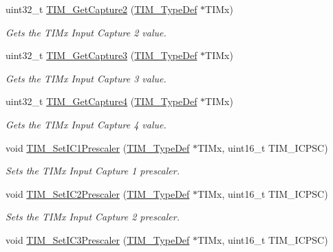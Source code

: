 \begin{DoxyCompactItemize}
uint32\+\_\+t \hyperlink{group___t_i_m___group3_ga2524cb5db14e388fb7f20c99fb3d58a5}{T\+I\+M\+\_\+\+Get\+Capture2} (\hyperlink{struct_t_i_m___type_def}{T\+I\+M\+\_\+\+Type\+Def} $\ast$T\+I\+Mx)
\begin{DoxyCompactList}\small\item\em Gets the T\+I\+Mx Input Capture 2 value. \end{DoxyCompactList}\item 
uint32\+\_\+t \hyperlink{group___t_i_m___group3_ga71ee9ce2c535ec0fb3fac5f9119221f7}{T\+I\+M\+\_\+\+Get\+Capture3} (\hyperlink{struct_t_i_m___type_def}{T\+I\+M\+\_\+\+Type\+Def} $\ast$T\+I\+Mx)
\begin{DoxyCompactList}\small\item\em Gets the T\+I\+Mx Input Capture 3 value. \end{DoxyCompactList}\item 
uint32\+\_\+t \hyperlink{group___t_i_m___group3_ga420b022cbc71ac603b5dd4922687abb1}{T\+I\+M\+\_\+\+Get\+Capture4} (\hyperlink{struct_t_i_m___type_def}{T\+I\+M\+\_\+\+Type\+Def} $\ast$T\+I\+Mx)
\begin{DoxyCompactList}\small\item\em Gets the T\+I\+Mx Input Capture 4 value. \end{DoxyCompactList}\item 
void \hyperlink{group___t_i_m___group3_gaf0f684dea88e222de9689d8ed0ca8805}{T\+I\+M\+\_\+\+Set\+I\+C1\+Prescaler} (\hyperlink{struct_t_i_m___type_def}{T\+I\+M\+\_\+\+Type\+Def} $\ast$T\+I\+Mx, uint16\+\_\+t T\+I\+M\+\_\+\+I\+C\+P\+SC)
\begin{DoxyCompactList}\small\item\em Sets the T\+I\+Mx Input Capture 1 prescaler. \end{DoxyCompactList}\item 
void \hyperlink{group___t_i_m___group3_ga3cc4869b5fe73271808512c89322a325}{T\+I\+M\+\_\+\+Set\+I\+C2\+Prescaler} (\hyperlink{struct_t_i_m___type_def}{T\+I\+M\+\_\+\+Type\+Def} $\ast$T\+I\+Mx, uint16\+\_\+t T\+I\+M\+\_\+\+I\+C\+P\+SC)
\begin{DoxyCompactList}\small\item\em Sets the T\+I\+Mx Input Capture 2 prescaler. \end{DoxyCompactList}\item 
void \hyperlink{group___t_i_m___group3_ga76f906383b8132ebe00dffadb70cf7f9}{T\+I\+M\+\_\+\+Set\+I\+C3\+Prescaler} (\hyperlink{struct_t_i_m___type_def}{T\+I\+M\+\_\+\+Type\+Def} $\ast$T\+I\+Mx, uint16\+\_\+t T\+I\+M\+\_\+\+I\+C\+P\+SC)

\end{DoxyCompactItemize}
